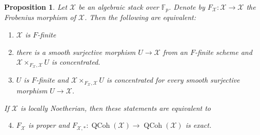 \documentclass[11pt]{amsart}
\theoremstyle{plain}
\newtheorem{proposition}[theorem]{Proposition}
\theoremstyle{definition}
\numberwithin{equation}{section}
\numberwithin{theorem}{section}
\begin{document}
\begin{proposition}
    \label{prop:F-finite_via_finite_presentation}
    Let $\mathcal{X}$ be an algebraic stack over $\mathbb{F}_p$. 
    Denote by $F_{\mathcal{X}}\colon \mathcal{X} \to \mathcal{X}$ the Frobenius morphism of $\mathcal{X}$. 
    Then the following are equivalent:
    \begin{enumerate}
        \item \label{prop:F-finite_via_finite_presentation1} $\mathcal{X}$ is $F$-finite
        \item \label{prop:F-finite_via_finite_presentation2} there is a smooth surjective morphism $U \to \mathcal{X}$ from an $F$-finite scheme and $\mathcal{X}\times_{F_\mathcal{X},\mathcal{X}} U$ is concentrated.
        \item \label{prop:F-finite_via_finite_presentation3} $U$ is $F$-finite and $\mathcal{X}\times_{F_\mathcal{X},\mathcal{X}} U$ is concentrated for every smooth surjective morphism $U \to \mathcal{X}$.
    \end{enumerate}
    If $\mathcal{X}$ is locally Noetherian, then these statements are equivalent to
    \begin{enumerate}
        \setcounter{enumi}{3}
        \item \label{prop:F-finite_via_finite_presentation4}$F_\mathcal{X}$ is proper and $F_{\mathcal{X},\ast}\colon\operatorname{QCoh}(\mathcal
        X)\to\operatorname{QCoh}(\mathcal
        X)$ is exact.
    \end{enumerate}
\end{proposition}
\end{document}
